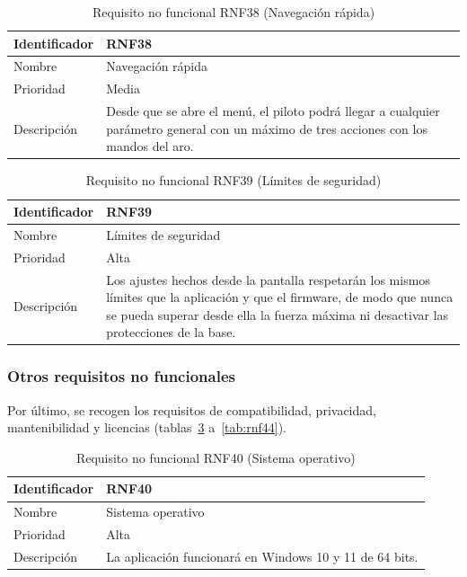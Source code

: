 \begin{table}[H]
	\centering
	\renewcommand{\arraystretch}{2}
	\begin{tabular}{|l|p{10cm}|}
		\hline
		Identificador & RNF38 \\
		\hline
		Nombre & Navegación rápida \\
		\hline
		Prioridad & Media \\
		\hline
		Descripción & Desde que se abre el menú, el piloto podrá llegar a cualquier parámetro general con un máximo de tres acciones con los mandos del aro. \\
		\hline
	\end{tabular}
	\caption{Requisito no funcional RNF38 (Navegación rápida)}
	\label{tab:rnf38}
\end{table}

\begin{table}[H]
	\centering
	\renewcommand{\arraystretch}{2}
	\begin{tabular}{|l|p{10cm}|}
		\hline
		Identificador & RNF39 \\
		\hline
		Nombre & Límites de seguridad \\
		\hline
		Prioridad & Alta \\
		\hline
		Descripción & Los ajustes hechos desde la pantalla respetarán los mismos límites que la aplicación y que el firmware, de modo que nunca se pueda superar desde ella la fuerza máxima ni desactivar las protecciones de la base. \\
		\hline
	\end{tabular}
	\caption{Requisito no funcional RNF39 (Límites de seguridad)}
	\label{tab:rnf39}
\end{table}

\subsubsection{Otros requisitos no funcionales}

Por último, se recogen los requisitos de compatibilidad, privacidad, mantenibilidad y licencias (tablas~\ref{tab:rnf40} a~\ref{tab:rnf44}).

\begin{table}[H]
	\centering
	\renewcommand{\arraystretch}{2}
	\begin{tabular}{|l|p{10cm}|}
		\hline
		Identificador & RNF40 \\
		\hline
		Nombre & Sistema operativo \\
		\hline
		Prioridad & Alta \\
		\hline
		Descripción & La aplicación funcionará en Windows 10 y 11 de 64 bits. \\
		\hline
	\end{tabular}
	\caption{Requisito no funcional RNF40 (Sistema operativo)}
	\label{tab:rnf40}
\end{table}

